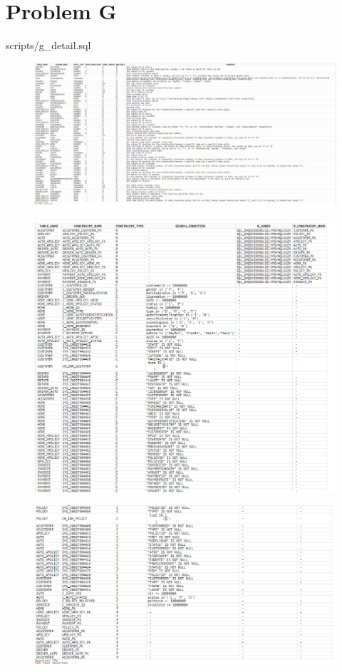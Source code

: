 \documentclass[12pt,english, openany]{book}
\begin{document}
\section{Problem G}
{scripts/g_detail.sql}
\begin{figure}[H]
        \centering
        \includegraphics[scale=0.27]{g1.png}
\end{figure}
\begin{figure}[H]
        \centering
        \includegraphics[scale=0.45]{g2_1.png}
\end{figure}
\begin{figure}[H]
        \centering
        \includegraphics[scale=0.45]{g2_2.png}
\end{figure}
\end{document}
